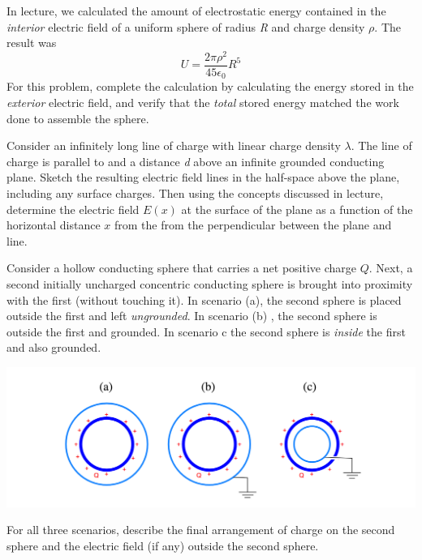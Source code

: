 \documentclass[11pt,letterpaper,boxed]{hmcpset}
\begin{document}
\begin{solution}
\vfill
\end{solution}
\newpage

\begin{problem}
In lecture, we calculated the amount of electrostatic energy contained in the \textit{interior} electric field of a uniform sphere of radius \textit{R }and charge density $\rho$. The result was 
$$ U =\frac{2\pi \rho^2}{45 \epsilon_0}R^5$$
For this problem, complete the calculation by calculating the energy stored in the \textit{exterior} electric field, and verify that the \textit{total} stored energy matched the work done to assemble the sphere. 
\end{problem}

\begin{solution}
\vfill
\end{solution}
\newpage

\begin{problem}[4.]
Consider an infinitely long line of charge with linear charge density $\lambda$. The line of charge is parallel to and a distance \textit{d} above an infinite  grounded conducting plane. Sketch the resulting electric field lines in the half-space above the plane, including any surface charges. Then using the concepts discussed in lecture, determine the electric field $E(x)$ at the surface of the plane as a function of the horizontal distance $x$ from the from the perpendicular between the plane and line.  
\end{problem}

\begin{solution}
\vfill
\end{solution}
\newpage

\begin{problem}[5.]
Consider a hollow conducting sphere that carries a net positive charge $Q$. Next, a second initially uncharged concentric conducting sphere is brought into proximity with the first (without touching  it). In scenario (a), the second sphere is placed outside the first and left \textit{ungrounded}. In scenario (b) , the second sphere is outside the first and grounded. In scenario c the second sphere is \textit{inside} the first and also grounded. 
\begin{center}
\includegraphics[scale=0.6]{5.png}
\end{center}
For all three scenarios, describe the final arrangement of charge on the second sphere and the electric field (if any) outside the second sphere. 
\end{problem}
\end{document}
